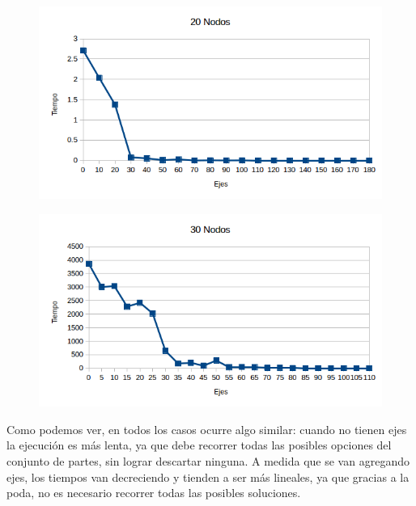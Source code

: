   \begin{figure}[h!]
   \begin{center}
 	\includegraphics[scale=0.4]{imagenes/exacto/20Nodos.png}
	\label{20Nodos}
   \end{center}
 \end{figure}
   \begin{figure}[h!]
   \begin{center}
 	\includegraphics[scale=0.4]{imagenes/exacto/30Nodos.png}
	\label{30Nodos}
   \end{center}
 \end{figure}
 
Como podemos ver, en todos los casos ocurre algo similar: cuando no tienen ejes la ejecuci\'on es m\'as lenta, ya que debe recorrer todas las posibles opciones del conjunto de partes, sin lograr descartar ninguna.
A medida que se van agregando ejes, los tiempos van decreciendo y tienden a ser m\'as lineales, ya que gracias a la poda, no es necesario recorrer todas las posibles soluciones.